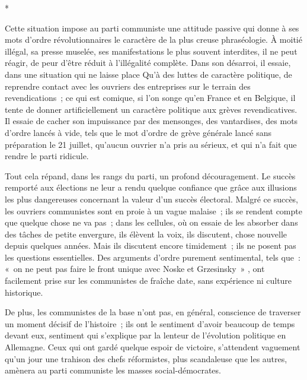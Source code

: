 \documentclass[french,twoside]{book} %
\begin{document}
\begin{center}
*\end{center}
\noindent Cette situation impose au parti communiste une attitude passive qui donne à ses mots d'ordre révolutionnaires le caractère de la plus creuse phraséologie. À moitié illégal, sa presse muselée, ses manifestations le plus souvent inter­dites, il ne peut réagir, de peur d'être réduit à l'illégalité complète. Dans son désarroi, il essaie, dans une situation qui ne laisse place Qu'à des luttes de caractère politique, de reprendre contact avec les ouvriers des entreprises sur le terrain des revendications ; ce qui est comique, si l'on songe qu'en France et en Belgique, il tente de donner artificiellement un caractère politique aux grèves revendicatives. Il essaie de cacher son impuissance par des mensonges, des vantardises, des mots d'ordre lancés à vide, tels que le mot d'ordre de grève générale lancé sans préparation le 21 juillet, qu'aucun ouvrier n'a pris au sérieux, et qui n'a fait que rendre le parti ridicule.\par
Tout cela répand, dans les rangs du parti, un profond découragement. Le succès remporté aux élections ne leur a rendu quelque confiance que grâce aux illusions les plus dangereuses concernant la valeur d'un succès électoral. Malgré ce succès, les ouvriers communistes sont en proie à un vague malaise ; ils se rendent compte que quelque chose ne va pas ; dans les cellules, où on essaie de les absorber dans des tâches de petite envergure, ils élèvent la voix, ils discutent, chose nouvelle depuis quelques années. Mais ils discutent encore timidement ; ils ne posent pas les questions essentielles. Des arguments d'ordre purement sentimental, tels que : « on ne peut pas faire le front unique avec Noske et Grzesinsky » , ont facilement prise sur les communistes de fraîche date, sans expérience ni culture historique.\par
De plus, les communistes de la base n'ont pas, en général, conscience de traverser un moment décisif de l'histoire ; ils ont le sentiment d'avoir beau­coup de temps devant eux, sentiment qui s'explique par la lenteur de l'évolu­tion politique en Allemagne. Ceux qui ont gardé quelque espoir de victoire, s'attendent vaguement qu'un jour une trahison des chefs réformistes, plus scandaleuse que les autres, amènera au parti communiste les masses social-démocrates.\par
\end{document}

